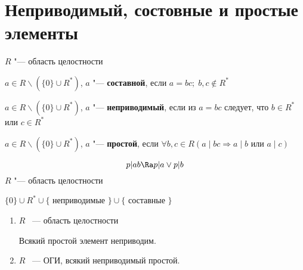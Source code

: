 \section{Неприводимый, состовные и простые элементы}
$R$ "--- область целостности 
\begin{Def}
	$a \in R \smallsetminus \left(\{0\} \cup R^{*}\right)$, $a$ "--- \textbf{составной}, если $a = bc; \; b, c \notin R^{*}$
\end{Def}

\begin{Def}
	$a \in R \smallsetminus \left(\{0\} \cup R^{*}\right)$, $a$ "--- \textbf{неприводимый}, если из $a = bc$ следует, что 
	$b \in R^{*}$ или $c \in R^{*}$
\end{Def}

\begin{Def}
	$a \in R \smallsetminus \left(\{0\} \cup R^{*}\right)$, $a$ "--- \textbf{простой}, если $\forall b, c \in R 
	\left(a \mid bc \Rightarrow a \mid b \text{ или } a \mid c \right)$ 
\end{Def}

$$p|ab \Ra p|a \vee p|b$$
$R$ "--- область целостности

$\{0\}\cup R^{*} \cup \{$ неприводимые $\} \cup \{$ составные $\}$

\begin{theorem}{}
\begin{enumerate}
    \item $R$ ~--- область целостности

    Всякий простой элемент неприводим.
    \item $R$ ~--- ОГИ, всякий неприводимый простой. 
\end{enumerate}
\end{theorem}

